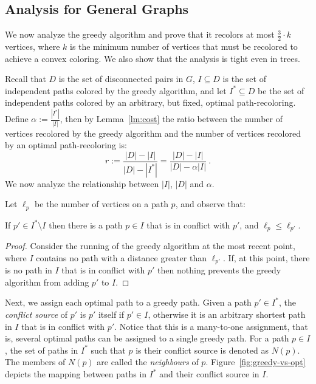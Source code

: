 
\subsection{Analysis for General Graphs}

We now analyze the greedy algorithm and prove that it recolors at most 
$\frac{3}{2} \cdot k$ vertices, 
where $k$ is the minimum number of vertices that must be recolored to achieve a convex
coloring.
%
We also show that the analysis is tight even in trees.

Recall that $D$ is the set of disconnected pairs in $G$, 
$I \subseteq D$ is the set of independent paths colored by the greedy algorithm, 
and let $I^* \subseteq D$ be the set of independent paths colored by an arbitrary, 
but fixed,
optimal path-recoloring.  
%
Define $\alpha := \frac{|I^*|}{|I|}$,
then by Lemma~\ref{lm:cost} the ratio between the number of 
vertices recolored by the greedy algorithm and the number of vertices
recolored by an optimal path-recoloring is:
\[
r := \frac{|D| - |I|}{|D| - |I^*|}
= \frac{|D| - |I|}{|D| - \alpha |I|}
~.
\]
We now analyze the relationship between $|I|$, $|D|$ and $\alpha$.

Let $\ell_p$ be the number of vertices on a path $p$, and observe that:

\begin{lemma}
\label{lemma:assign}
If $p' \in I^* \setminus I$ then there is a path $p \in I$ that is in
conflict with $p'$, and $\ell_p \leq \ell_{p'}$.
\end{lemma}
\begin{proof}
Consider the running of the greedy algorithm at the most recent point,
where $I$ contains no path with a distance greater than $\ell_{p'}$.  If,
at this point, there is no path in $I$ that is in conflict with $p'$
then nothing prevents the greedy algorithm from adding $p'$ to $I$.
{}\end{proof}

Next, we assign each optimal path to a greedy path.
%
Given a path $p' \in I^*$, the \emph{conflict source} of $p'$ is $p'$
itself if $p' \in I$, otherwise it is an arbitrary shortest path in
$I$ that is in conflict with $p'$.
%
Notice that this is a many-to-one assignment, that is, several optimal
paths can be assigned to a single greedy path.
%
For a path $p \in I$, the set of paths in $I^*$ such that $p$ is their
conflict source is denoted as $N(p)$.
The members of $N(p)$ are called the \emph{neighbours} of $p$.
Figure~\ref{fig:greedy-vs-opt} depicts the mapping between paths in 
$I^*$ and their conflict source in $I$.

